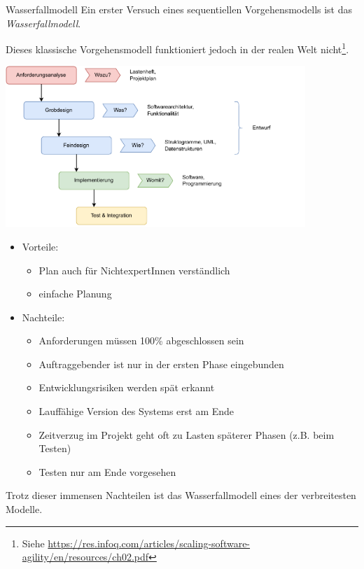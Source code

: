 \begin{defi}{Wasserfallmodell}
    Ein erster Versuch eines sequentiellen Vorgehensmodells ist das \emph{Wasserfallmodell}.

    Dieses klassische Vorgehensmodell funktioniert jedoch in der realen Welt nicht\footnote{Siehe \href{https://res.infoq.com/articles/scaling-software-agility/en/resources/ch02.pdf}{https://res.infoq.com/articles/scaling-software-agility/en/resources/ch02.pdf}}.

    \begin{center}
        \includegraphics[width=0.85\textwidth]{includes/figures/01_waterfall_model.pdf}
    \end{center}

    \begin{itemize}
        \item Vorteile:
              \begin{itemize}
                  \item Plan auch für NichtexpertInnen verständlich
                  \item einfache Planung
              \end{itemize}
        \item Nachteile:
              \begin{itemize}
                  \item Anforderungen müssen 100\% abgeschlossen sein
                  \item Auftraggebender ist nur in der ersten Phase eingebunden
                  \item Entwicklungsrisiken werden spät erkannt
                  \item Lauffähige Version des Systems erst am Ende
                  \item Zeitverzug im Projekt geht oft zu Lasten späterer Phasen (z.B. beim Testen)
                  \item Testen nur am Ende vorgesehen
              \end{itemize}
    \end{itemize}

    Trotz dieser immensen Nachteilen ist das Wasserfallmodell eines der verbreitesten Modelle.
\end{defi}


